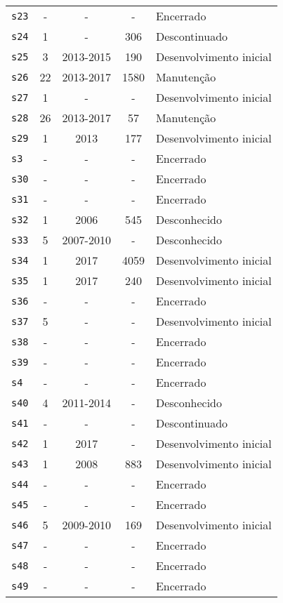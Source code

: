 \begin{longtable}{ l c c c l }
    \texttt{s23} & - & - & - & Encerrado \\
    \texttt{s24} & 1 & - & 306 & Descontinuado \\
    \texttt{s25} & 3 & 2013-2015 & 190 & Desenvolvimento inicial \\
    \texttt{s26} & 22 & 2013-2017 & 1580 & Manutenção \\
    \texttt{s27} & 1 & - & - & Desenvolvimento inicial \\
    \texttt{s28} & 26 & 2013-2017 & 57 & Manutenção \\
    \texttt{s29} & 1 & 2013 & 177 & Desenvolvimento inicial \\
    \texttt{s3} & - & - & - & Encerrado \\
    \texttt{s30} & - & - & - & Encerrado \\
    \texttt{s31} & - & - & - & Encerrado \\
    \texttt{s32} & 1 & 2006 & 545 & Desconhecido \\
    \texttt{s33} & 5 & 2007-2010 & - & Desconhecido \\
    \texttt{s34} & 1 & 2017 & 4059 & Desenvolvimento inicial \\
    \texttt{s35} & 1 & 2017 & 240 & Desenvolvimento inicial \\
    \texttt{s36} & - & - & - & Encerrado \\
    \texttt{s37} & 5 & - & - & Desenvolvimento inicial \\
    \texttt{s38} & - & - & - & Encerrado \\
    \texttt{s39} & - & - & - & Encerrado \\
    \texttt{s4} & - & - & - & Encerrado \\
    \texttt{s40} & 4 & 2011-2014 & - & Desconhecido \\
    \texttt{s41} & - & - & - & Descontinuado \\
    \texttt{s42} & 1 & 2017 & - & Desenvolvimento inicial \\
    \texttt{s43} & 1 & 2008 & 883 & Desenvolvimento inicial \\
    \texttt{s44} & - & - & - & Encerrado \\
    \texttt{s45} & - & - & - & Encerrado \\
    \texttt{s46} & 5 & 2009-2010 & 169 & Desenvolvimento inicial \\
    \texttt{s47} & - & - & - & Encerrado \\
    \texttt{s48} & - & - & - & Encerrado \\
    \texttt{s49} & - & - & - & Encerrado \\

\end{longtable}
